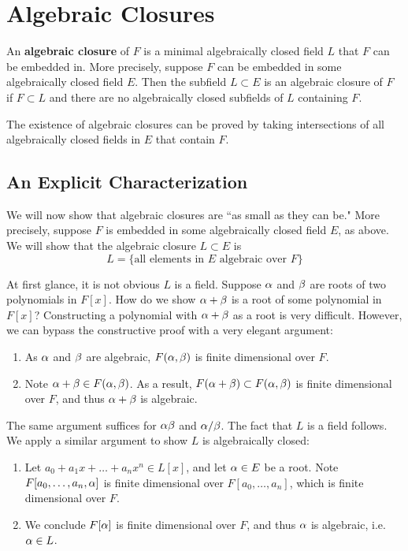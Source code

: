 \section{Algebraic Closures}
An \textbf{algebraic closure} of $F$ is a minimal algebraically closed field $L$ that $F$ can be embedded in. More precisely, suppose $F$ can be embedded in some algebraically closed field $E$. Then the subfield $L \subset E$ is an algebraic closure of $F$ if $F \subset L$ and there are no algebraically closed subfields of $L$ containing $F$.

The existence of algebraic closures can be proved by taking intersections of all algebraically closed fields in $E$ that contain $F$.

\subsection{An Explicit Characterization}
We will now show that algebraic closures are ``as small as they can be." More precisely, suppose $F$ is embedded in some algebraically closed field $E$, as above. We will show that the algebraic closure $L \subset E$ is
\[
    L = \{\text{all elements in $E$ algebraic over $F$}\}
\]

At first glance, it is not obvious $L$ is a field. Suppose $\alpha$ and $\beta$ are roots of two polynomials in $F[x]$. How do we show $\alpha + \beta$ is a root of some polynomial in $F[x]$? Constructing a polynomial with $\alpha + \beta$ as a root is very difficult. However, we can bypass the constructive proof with a very elegant argument:
\begin{enumerate}
    \item As $\alpha$ and $\beta$ are algebraic, $F(\alpha, \beta)$ is finite dimensional over $F$.
    \item Note $\alpha + \beta \in F(\alpha, \beta)$. As a result, $F(\alpha + \beta) \subset F(\alpha, \beta)$ is finite dimensional over $F$, and thus $\alpha + \beta$ is algebraic.
\end{enumerate}
The same argument suffices for $\alpha\beta$ and $\alpha/\beta$. The fact that $L$ is a field follows. We apply a similar argument to show $L$ is algebraically closed:
\begin{enumerate}
    \item Let $a_0 + a_1x + \dots + a_nx^n \in L[x]$, and let $\alpha \in E$ be a root. Note $F[a_0, \dots, a_n, \alpha]$ is finite dimensional over $F[a_0, \dots, a_n]$, which is finite dimensional over $F$.
    \item We conclude $F[\alpha]$ is finite dimensional over $F$, and thus $\alpha$ is algebraic, i.e. $\alpha \in L$.
\end{enumerate}

